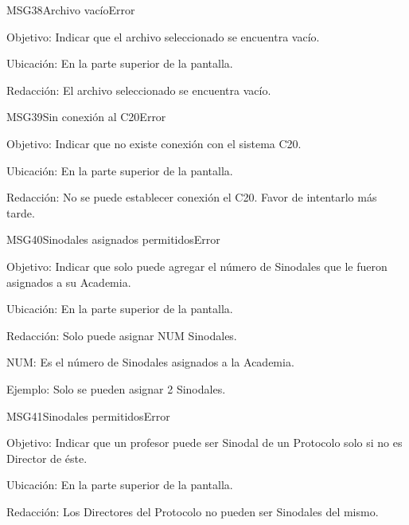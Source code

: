 \begin{mensaje}{MSG38}{Archivo vacío}{Error}
	\item[Objetivo:] Indicar que el archivo seleccionado se encuentra vacío.
	\item[Ubicación:] En la parte superior de la pantalla.
	\item[Redacción:] El archivo seleccionado se encuentra vacío.
\end{mensaje}

\begin{mensaje}{MSG39}{Sin conexión al C20}{Error}
	\item[Objetivo:] Indicar que no existe conexión con el sistema C20.
	\item[Ubicación:] En la parte superior de la pantalla.
	\item[Redacción:] No se puede establecer conexión el C20. Favor de intentarlo más tarde.
\end{mensaje}

\begin{mensaje}{MSG40}{Sinodales asignados permitidos}{Error}
	\item[Objetivo:] Indicar que solo puede agregar el número de Sinodales que le fueron asignados a su Academia.
	\item[Ubicación:] En la parte superior de la pantalla.
	\item[Redacción:] Solo puede asignar NUM Sinodales.
	\begin{Citemize}
		\item NUM: Es el número de Sinodales asignados a la Academia.
	\end{Citemize}
	\item [Ejemplo:] Solo se pueden asignar 2 Sinodales.
\end{mensaje}

\begin{mensaje}{MSG41}{Sinodales permitidos}{Error}
	\item[Objetivo:] Indicar que un profesor puede ser Sinodal de un Protocolo solo si no es Director de éste.
	\item[Ubicación:] En la parte superior de la pantalla.
	\item[Redacción:] Los Directores del Protocolo no pueden ser Sinodales del mismo.
\end{mensaje}

